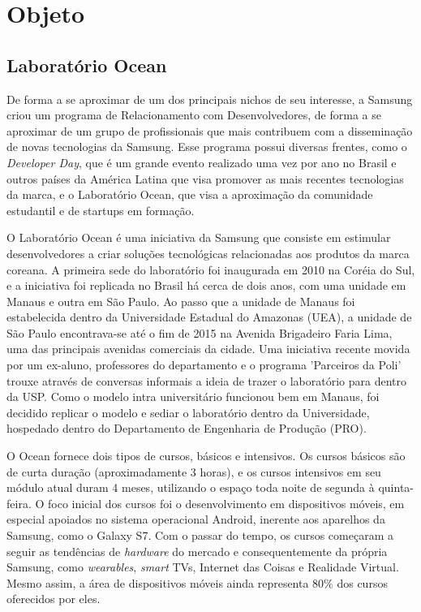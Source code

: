 \chapter{Objeto}
\section{Laboratório Ocean}

De forma a se aproximar de um dos principais nichos de seu interesse, a Samsung criou um programa de Relacionamento com Desenvolvedores, de forma a se aproximar de um grupo de profissionais que mais contribuem com a disseminação de novas tecnologias da Samsung. Esse programa possui diversas frentes, como o \textit{Developer Day}, que é um grande evento realizado uma vez por ano no Brasil e outros países da América Latina que visa promover as mais recentes tecnologias da marca, e o Laboratório Ocean, que visa a aproximação da comunidade estudantil e de startups em formação.

O Laboratório Ocean é uma iniciativa da Samsung que consiste em estimular desenvolvedores a criar soluções tecnológicas relacionadas aos produtos da marca coreana. A primeira sede do laboratório foi inaugurada em 2010 na Coréia do Sul, e a iniciativa foi replicada no Brasil há cerca de dois anos, com uma unidade em Manaus e outra em São Paulo. Ao passo que a unidade de Manaus foi estabelecida dentro da Universidade Estadual do Amazonas (UEA), a unidade de São Paulo encontrava-se até o fim de 2015 na Avenida Brigadeiro Faria Lima, uma das principais avenidas comerciais da cidade. Uma iniciativa recente movida por um ex-aluno, professores do departamento e o programa 'Parceiros da Poli' trouxe através de conversas informais a ideia de trazer o laboratório para dentro da USP. Como o modelo intra universitário funcionou bem em Manaus, foi decidido replicar o modelo e sediar o laboratório dentro da Universidade, hospedado dentro do Departamento de Engenharia de Produção (PRO).

O Ocean fornece dois tipos de cursos, básicos e intensivos. Os cursos básicos são de curta duração (aproximadamente 3 horas), e os cursos intensivos em seu módulo atual duram 4 meses, utilizando o espaço toda noite de segunda à quinta-feira. O foco inicial dos cursos foi o desenvolvimento em dispositivos móveis, em especial apoiados no sistema operacional Android, inerente aos aparelhos da Samsung, como o Galaxy S7. Com o passar do tempo, os cursos começaram a seguir as tendências de \textit{hardware} do mercado e consequentemente da própria Samsung, como \textit{wearables}, \textit{smart} TVs, Internet das Coisas e Realidade Virtual. Mesmo assim, a área de dispositivos móveis ainda representa 80\% dos cursos oferecidos por eles.


